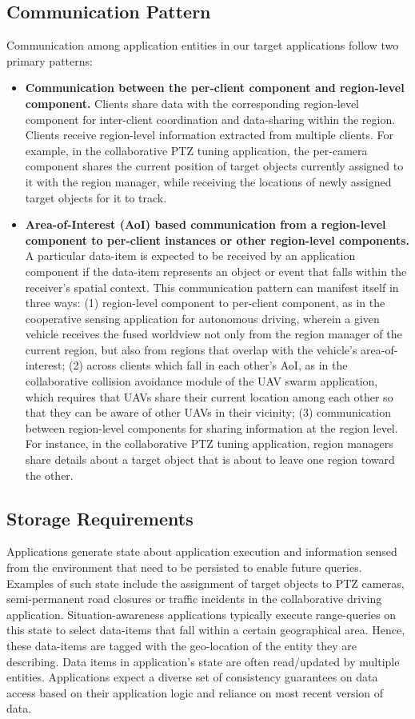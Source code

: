 \subsection{Communication Pattern}
\label{sec:app_model_comm}
Communication among application entities in our target applications follow two primary patterns:
\begin{itemize}
\item \textbf{Communication between the per-client component and region-level component.} Clients share data with the corresponding region-level component for inter-client coordination and data-sharing within the region. Clients receive region-level information extracted from multiple clients. For example, in the collaborative PTZ tuning application, the per-camera component shares the current position of target objects currently assigned to it with the region manager, while receiving the locations of newly assigned target objects for it to track.
\item \textbf{Area-of-Interest (AoI) based communication from a region-level component to per-client instances or other region-level components.} A particular data-item is expected to be received by an application component if the data-item represents an object or event that falls within the receiver's spatial context. This communication pattern can manifest itself in three ways: (1) region-level component to per-client component, as in the cooperative sensing application for autonomous driving, wherein a given vehicle receives the fused worldview not only from the region manager of the current region, but also from regions that overlap with the vehicle's area-of-interest; (2) across clients which fall in each other's AoI, as in the collaborative collision avoidance module of the UAV swarm application, which requires that UAVs share their current location among each other so that they can be aware of other UAVs in their vicinity; (3) communication between region-level components for sharing information at the region level. For instance, in the collaborative PTZ tuning application, region managers share details about a target object that is about to leave one region toward the other.
\end{itemize}
\subsection{Storage Requirements}
Applications generate state about application execution and information sensed from the environment that need to be persisted to enable future queries. Examples of such state include the assignment of target objects to PTZ cameras, semi-permanent road closures or traffic incidents in the collaborative driving application. Situation-awareness applications typically execute range-queries on this state to select data-items that fall within a certain geographical area. Hence, these data-items are tagged with the geo-location of the entity they are describing. Data items in application's state are often read/updated by multiple entities. Applications expect a diverse set of  consistency guarantees on data access based on their application logic and reliance on most recent version of data.

